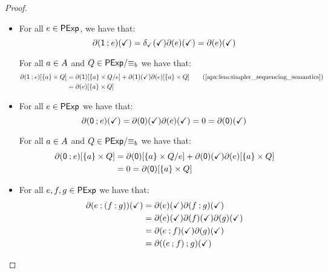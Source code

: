 \begin{proof}
\begin{itemize}[leftmargin=0em]
        \item[] 
        For all $e \in \mathsf{PExp}$, we have that:
        $$\partial(\mathsf{1} \mathbin{;} e)(\checkmark) = \delta_{\checkmark}(\checkmark)\partial(e)(\checkmark)=\partial(e)(\checkmark)$$

        For all $a \in {A}$ and $Q \in {\mathsf{PExp}}/{\equiv_b}$ we have that:
        \begin{align*}
            \partial(\one \seq e)[\{a\} \times Q] &= \partial(\one)[\{a\} \times {Q}/{e}] + \partial(\one)(\checkmark)\partial(e)[\{a\} \times Q] \tag{\Cref{apx:lem:simpler_sequencing_semantics}}\\
            &= \partial(e)[\{a\} \times {Q}]
        \end{align*}

        \item[] 
        For all $e \in \mathsf{PExp}$ we have that: 
        $$\partial(\mathsf{0} \mathbin{;} e)(\checkmark) = \partial(\mathsf{0})(\checkmark)\partial(e)(\checkmark) = 0 = \partial(\mathsf{0})(\checkmark)$$
        
        For all $a \in {A}$ and $Q \in {\mathsf{PExp}}/{\equiv_b}$ we have that:
        \begin{align*}
            \partial(\mathsf{0} \mathbin{;} e)[\{a\} \times Q] &= \partial(\mathsf{0})[\{a\} \times Q/{e}] + \partial(\mathsf{0})(\checkmark)\partial(e)[\{a\}\times Q]\\
            &=0=\partial(\mathsf{0})[\{a\} \times Q]
        \end{align*}

        \item[] 
        For all $e,f,g \in \mathsf{PExp}$ we have that:
        \begin{align*}
            \partial(e \mathbin{;} (f \mathbin{;} g))(\checkmark) &= \partial(e)(\checkmark)\partial(f \mathbin{;} g)(\checkmark)\\
            &=\partial(e)(\checkmark)\partial(f)(\checkmark)\partial(g)(\checkmark)\\
            &=\partial(e \mathbin{;} f)(\checkmark)\partial(g)(\checkmark)\\
            &=\partial((e \mathbin{;} f) \mathbin{;} g)(\checkmark)
        \end{align*}


\end{itemize}
\end{proof}
